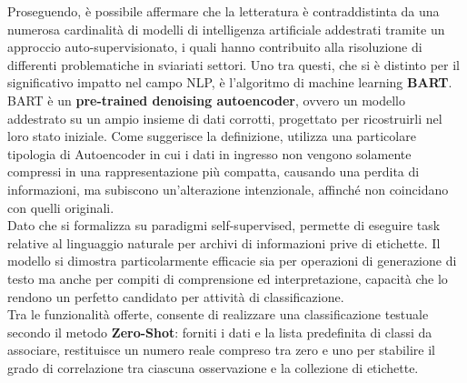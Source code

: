 Proseguendo, è possibile affermare che la letteratura è contraddistinta da una numerosa cardinalità di modelli di intelligenza artificiale addestrati tramite un approccio auto-supervisionato, i quali hanno contribuito alla risoluzione di differenti problematiche in sviariati settori. Uno tra questi, che si è distinto per il significativo impatto nel campo NLP, è l'algoritmo di machine learning \textbf{BART}. \vspace{7pt} \\
BART è un \textbf{pre-trained denoising autoencoder}, ovvero un modello addestrato su un ampio insieme di dati corrotti, progettato per ricostruirli nel loro stato iniziale. Come suggerisce la definizione, utilizza una particolare tipologia di Autoencoder in cui i dati in ingresso non vengono solamente compressi in una rappresentazione più compatta, causando una perdita di informazioni, ma subiscono un'alterazione intenzionale, affinché non coincidano con quelli originali. \vspace{7pt} \\
Dato che si formalizza su paradigmi self-supervised, permette di eseguire task relative al linguaggio naturale per archivi di informazioni prive di etichette. Il modello si dimostra particolarmente efficacie sia per operazioni di generazione di testo ma anche per compiti di comprensione ed interpretazione, capacità che lo rendono un perfetto candidato per attività di classificazione. \vspace{7pt} \\
Tra le funzionalità offerte, consente di realizzare una classificazione testuale secondo il metodo \textbf{Zero-Shot}: forniti i dati e la lista predefinita di classi da associare, restituisce un numero reale compreso tra zero e uno per stabilire il grado di correlazione tra ciascuna osservazione e la collezione di etichette.